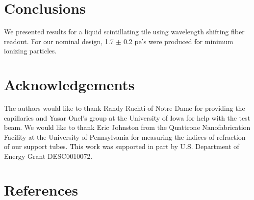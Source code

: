 \documentclass[review]{elsarticle}
\begin{document}
\section{Conclusions}

We presented results for a liquid scintillating tile using wavelength shifting fiber readout.  For our nominal design, 1.7 ${\pm}$ 0.2 pe's were produced for minimum ionizing particles.  

\section{Acknowledgements}
The authors would like to thank Randy Ruchti of Notre Dame for providing the capillaries and Yasar Onel's group at the University of Iowa for help with the test beam.  We would like to thank Eric Johnston from the Quattrone Nanofabrication Facility  at the University of Pennsylvania for measuring the indices of refraction of our support tubes.
This work was supported in part by U.S. Department of Energy Grant DESC0010072.

\section*{References}


\end{document}
